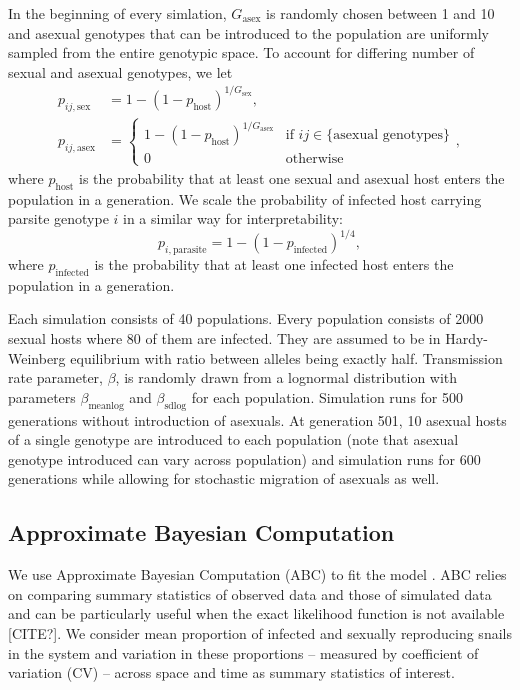 \documentclass{article}\usepackage[]{graphicx}\usepackage[]{color}
\begin{document}
In the beginning of every simlation, $G_{\textrm{asex}}$ is randomly chosen between 1 and 10 and asexual genotypes that can be introduced to the population are uniformly sampled from the entire genotypic space.
To account for differing number of sexual and asexual genotypes, we let 
\begin{equation}
\begin{aligned}
p_{ij, \textrm{sex}} &= 1-(1-p_{\textrm{host}})^{1/G_\textrm{sex}},\\
p_{ij, \textrm{asex}} &=
\begin{cases}
1-(1-p_{\textrm{host}})^{1/G_\textrm{asex}} & \text{if } ij \in \{\text{asexual genotypes}\} \\
0 & \text{otherwise}
\end{cases},
\end{aligned}
\end{equation}
where $p_{\textrm{host}}$ is the probability that at least one sexual and asexual host enters the population in a generation. We scale the probability of infected host carrying parsite genotype $i$ in a similar way for interpretability:
\begin{equation}
p_{i, \textrm{parasite}} = 1 - (1-p_{\textrm{infected}})^{1/4},
\end{equation}
where $p_{\textrm{infected}}$ is the probability that at least one infected host enters the population in a generation.

Each simulation consists of 40 populations. Every population consists of 2000 sexual hosts where 80 of them are infected. They are assumed to be in Hardy-Weinberg equilibrium with ratio between alleles being exactly half. Transmission rate parameter, $\beta$, is randomly drawn from a lognormal distribution with parameters $\beta_{\textrm{meanlog}}$ and $\beta_{\textrm{sdlog}}$ for each population. Simulation runs for 500 generations without introduction of asexuals. At generation 501, 10 asexual hosts of a single genotype are introduced to each population (note that asexual genotype introduced can vary across population) and simulation runs for 600 generations while allowing for stochastic migration of asexuals as well.

\subsection{Approximate Bayesian Computation}

We use Approximate Bayesian Computation (ABC) to fit the model \citep{toni2009approximate}.
ABC relies on comparing summary statistics of observed data and those of simulated data and can be particularly useful when the exact likelihood function is not available [CITE?].
We consider mean proportion of infected and sexually reproducing snails in the system and variation in these proportions -- measured by coefficient of variation (CV) -- across space and time as summary statistics of interest.
\end{document}
